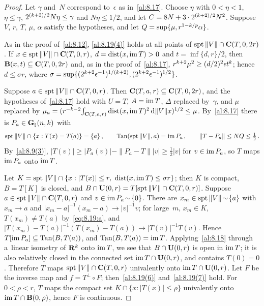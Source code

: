 \begin{proof}
    Let $\gamma$ and~$N$ correspond to~$\epsilon$ as in~\ref{al:8.17}. Choose $\eta$ with $0 < \eta
    < 1$, $\eta \le \gamma$, $2^{(k+2)/2} N \eta \le \gamma$ and $N \eta \le 1/2$, and let $C = 8
    N + 3 \cdot 2^{(k+2)/2} N^2$. Suppose $V$, $r$, $T$, $\mu$, $\alpha$ satisfy the hypotheses,
    and let $Q = \sup \{ \mu, r^{1 - k/p} \alpha \}$.

    As in the proof of~\ref{al:8.12}, \ref{al:8.19(4)} holds at all points of $\operatorname{spt} \|V\| \cap
    \mathbf{C} ( T, 0, 2r )$. If $x \in \operatorname{spt} \|V\| \cap \mathbf{C} ( T, 0, r )$, $d = \operatorname{dist}(x, \operatorname{im} T) > 0$ and
    $t = \inf \{ d, r \}/2$, then $\mathbf{B}(x,t) \subseteq \mathbf{C} ( T, 0, 2r )$ and, as in the proof
    of~\ref{al:8.17}, $r^{k+2} \mu^2 \ge (d/2)^2 \epsilon t^{k}$; hence $d \le \sigma r$,
    where $\sigma = \sup \{ (2^{k+2} \epsilon^{-1})^{1/(k+2)}, (2^{k+2}
    \epsilon^{-1})^{1/2} \}$.

    Suppose $a \in \operatorname{spt} \|V\| \cap \mathbf{C} ( T, 0, r )$. Then $\mathbf{C} ( T, a, r ) \subseteq
    \mathbf{C} ( T, 0, 2r )$, and the hypotheses of~\ref{al:8.17} hold with $U = T$, $A = \operatorname{im} T$,
    $\Delta$ replaced by~$\gamma$, and $\mu$ replaced by $\mu_a = (r^{-k-2}
    {\textstyle\int_{\mathbf{C} ( T, a, r )}^{}} \operatorname{dist}(x, \operatorname{im} T)^2 \,\mathrm{d} \|V\| x)^{1/2} \le \mu$. By~\ref{al:8.17}
    there is $P_a \in \mathbf{G}_{\natural}(n,k)$ with
    \begin{equation}
        \label{eq:8.19:a}
        \operatorname{spt} \|V\| \cap \{ x : T(x) = T(a) \} = \{ a \} \,, \qquad \operatorname{Tan}(\operatorname{spt} \|V\|, a) = \operatorname{im} P_a \,,
        \qquad \|T - P_a\| \le N Q \le \tfrac12 \,.
    \end{equation}
    By~\ref{al:8.9(3)}, $|T(v)| \ge |P_a(v)| - \|P_a - T\| |v| \ge \frac12 |v|$ for $v \in \operatorname{im} P_a$,
    so $T$ maps $\operatorname{im} P_a$ onto $\operatorname{im} T$.

    Let $K = \operatorname{spt} \|V\| \cap \{ x : |T(x)| \le r, \ \operatorname{dist}(x, \operatorname{im} T) \le \sigma r \}$; then $K$ is
    compact, $B = T[K]$ is closed, and $B \cap \mathbf{U}(0,r) = T[\operatorname{spt} \|V\| \cap \mathbf{C} ( T, 0, r )]$.
    Suppose $a \in \operatorname{spt} \|V\| \cap \mathbf{C} ( T, 0, r )$ and $v \in \operatorname{im} P_a \!\sim\! \{0\}$. There are
    $x_m \in \operatorname{spt} \|V\| \!\sim\! \{a\}$ with $x_m \to a$ and $|x_m - a|^{-1} (x_m - a) \to |v|^{-1}
    v$; for large~$m$, $x_m \in K$, $T(x_m) \ne T(a)$ by~\eqref{eq:8.19:a}, and $|T(x_m) -
    T(a)|^{-1} (T(x_m) - T(a)) \to |T(v)|^{-1} T(v)$. Hence $T[\operatorname{im} P_a] \subseteq \operatorname{Tan}(B, T(a))$, and
    $\operatorname{Tan}(B, T(a)) = \operatorname{im} T$. Applying~\ref{al:8.18} through a~linear isometry of $\mathbf{R}^{k}$ onto
    $\operatorname{im} T$, we see that $B \cap \mathbf{U}(0,r)$ is open in $\operatorname{im} T$; it is also relatively closed in
    the connected set $\operatorname{im} T \cap \mathbf{U}(0,r)$, and contains $T(0) = 0$. Therefore $T$ maps $\operatorname{spt}
    \|V\| \cap \mathbf{C} ( T, 0, r )$ univalently onto $\operatorname{im} T \cap \mathbf{U}(0,r)$. Let $F$ be the inverse
    map and $f = T^\perp \circ F$; then~\ref{al:8.19(6)} and~\ref{al:8.19(7)} hold. For $0 < \rho <
    r$, $T$ maps the compact set $K \cap \{ x : |T(x)| \le \rho \}$ univalently onto $\operatorname{im} T \cap
    \mathbf{B}(0,\rho)$, hence $F$ is continuous.


\end{proof}
